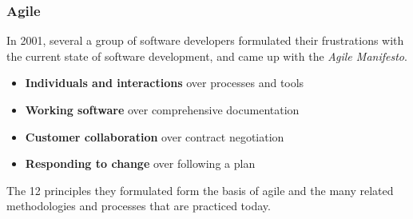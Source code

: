 \begin{frame}
\frametitle{Agile}
In 2001, several a group of software developers formulated their frustrations
with the current state of software development, and came up with the
\emph{Agile Manifesto}\footnotemark[1].
\vspace{0.25cm}
\begin{itemize}
    \item \textbf{Individuals and interactions} over processes and tools
    \item \textbf{Working software} over comprehensive documentation
    \item \textbf{Customer collaboration} over contract negotiation
    \item \textbf{Responding to change} over following a plan
\end{itemize}
\vspace{0.25cm}
The 12 principles they formulated form the basis of agile and the many related
methodologies and processes that are practiced today.
\end{frame}

